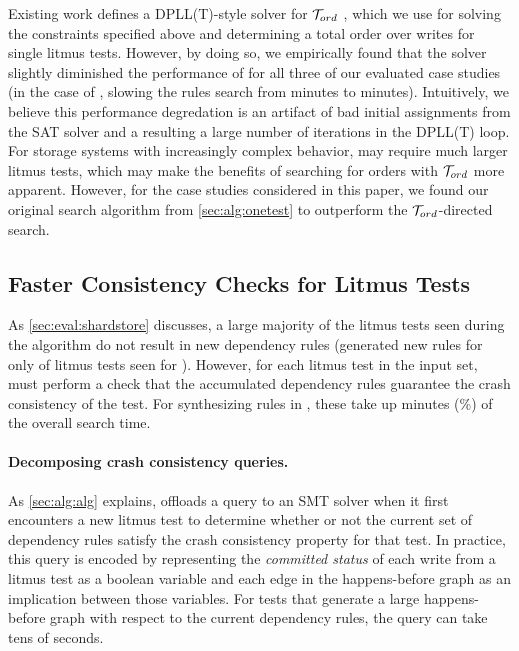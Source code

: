 Existing work defines a DPLL(T)-style solver for $\mathcal{T}_{ord}$ \cite{n:tord},
which we use for solving the constraints specified above and
determining a total order over writes for single litmus tests.
However, by doing so, we empirically found that the solver
slightly diminished the performance of \depsynth for all three of our evaluated case studies
(in the case of \shardstore, slowing the rules search from
\shardstoresynthesistime minutes to \shardstoresynthesistimetord minutes).
Intuitively, we believe this performance degredation is an artifact of 
bad initial assignments from the SAT solver
and a resulting a large number of iterations in the DPLL(T) loop.
For storage systems with increasingly complex behavior,
\depsynth may require much larger litmus tests,
which may make the benefits of searching for orders with $\mathcal{T}_{ord}$ more apparent.
However, for the case studies considered in this paper,
we found our original search algorithm from \cref{sec:alg:onetest}
to outperform the $\mathcal{T}_{ord}$-directed search.

\subsection{Faster Consistency Checks for Litmus Tests}
\label{s:improved-search}
As \cref{sec:eval:shardstore} discusses,
a large majority of the litmus tests seen during the \depsynth
algorithm do not result in new dependency rules
(\depsynth generated new rules for only \shardstoretestsused of \shardstoreinputtests
 litmus tests seen for \shardstore).
However, for each litmus test in the input set, \depsynth
must perform a check that the accumulated dependency rules
guarantee the crash consistency of the test.
For synthesizing rules in \shardstore,
these take up \shardstoreverificationminutes minutes (\shardstoreverificationpercent\%)
of the overall search time.

\paragraph{Decomposing crash consistency queries.}
As \cref{sec:alg:alg} explains, \depsynth offloads a query to an SMT
solver when it first encounters a new litmus test to determine
whether or not the current set of dependency rules satisfy the
crash consistency property for that test.
In practice, this query is encoded by representing the \textit{committed status}
of each write from a litmus test as a boolean variable
and each edge in the happens-before graph as an implication between those variables.
For tests that generate a large happens-before graph
with respect to the current dependency rules,
the query can take tens of seconds.

